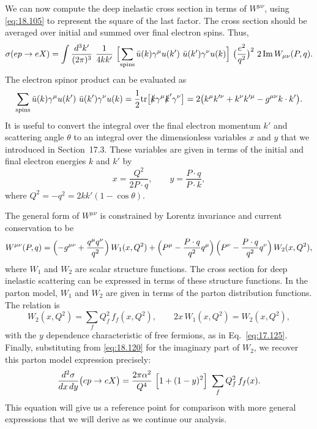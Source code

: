 We can now compute the deep inelastic cross section in terms of
$W^{\mu\nu}$, using \eqref{eq:18.105} to represent the square of the last
factor.  The cross section should be averaged over initial and summed over
final electron spins.  Thus,
\begin{equation}
  \sigma(ep \to eX) = \int \frac{d^3k'}{(2\pi)^3}\ \frac{1}{4kk'}\ \Bigl[
    \sum_{\text{spins}} \bar{u}(k)\gamma^\mu u(k')\ \bar{u}(k')\gamma^\nu
    u(k) \Bigr]\ \bigl( \frac{e^2}{q^2} \bigr)^2\ 2\,\mathrm{Im}\,W_{\mu\nu}
    (P, q) .
  \label{eq:18.106}
\end{equation}
The electron spinor product can be evaluated as
\begin{equation}
  \sum_{\text{spins}} \bar{u}(k)\gamma^\mu u(k')\ \bar{u}(k')\gamma^\nu
    u(k) = \frac{1}{2}\mathrm{tr}\bigl[ \slashed{k}\gamma^\mu
    \slashed{k}'\gamma^\nu \bigr]
  = 2\bigl( k^\mu k'^{\nu} + k^\nu k'^{\mu} - g^{\mu\nu}k\cdot k'
    \bigr) .
  \label{eq:18.107}
\end{equation}
It is useful to convert the integral over the final electron momentum $k'$
and scattering angle $\theta$ to an integral over the dimensionless variables
$x$ and $y$ that we introduced in Section~17.3.  These variables are given in
terms of the initial and final electron energies $k$ and $k'$ by
\begin{equation}
  x = \frac{Q^2}{2P\cdot q},\qquad
  y = \frac{P\cdot q}{P\cdot k} ,
  \label{eq:18.108}
\end{equation}
where $Q^2 = -q^2 = 2kk'(1-\cos\theta)$.

The general form of $W^{\mu\nu}$ is constrained by Lorentz invariance and
current conservation to be
\begin{equation}
  W^{\mu\nu}(P, q) = \Bigl( -g^{\mu\nu} + \frac{q^\mu q^\nu}{q^2} \Bigr)\,
    W_1(x, Q^2) + \Bigl( P^\mu - \frac{P\cdot q}{q^2}q^\mu \Bigr)\,
    \Bigl( P^\nu - \frac{P\cdot q}{q^2}q^\nu \Bigr)\,
    W_2(x, Q^2) ,
  \label{eq:18.113}
\end{equation}
where $W_1$ and $W_2$ are scalar structure functions.  The cross section for
deep inelastic scattering can be expressed in terms of these structure
functions.  In the parton model, $W_1$ and $W_2$ are given in terms of the
parton distribution functions.  The relation is
\begin{equation}
  W_2(x, Q^2) = \sum_f Q_f^2\,f_f(x, Q^2),\qquad
  2x\,W_1(x, Q^2) = W_2(x, Q^2) ,
  \label{eq:18.120}
\end{equation}
with the $y$ dependence characteristic of free fermions, as in
Eq.~\eqref{eq:17.125}.  Finally, substituting from \eqref{eq:18.120} for the
imaginary part of $W_2$, we recover this parton model expression precisely:
\begin{equation}
  \frac{d^2\sigma}{dx\,dy}\bigl( ep \to eX \bigr)
  = \frac{2\pi\alpha^2}{Q^4}\ \Bigl[ 1 + (1-y)^2 \Bigr]\
    \sum_f Q_f^2\,f_f(x) .
  \label{eq:18.123}
\end{equation}
This equation will give us a reference point for comparison with more general
expressions that we will derive as we continue our analysis.

